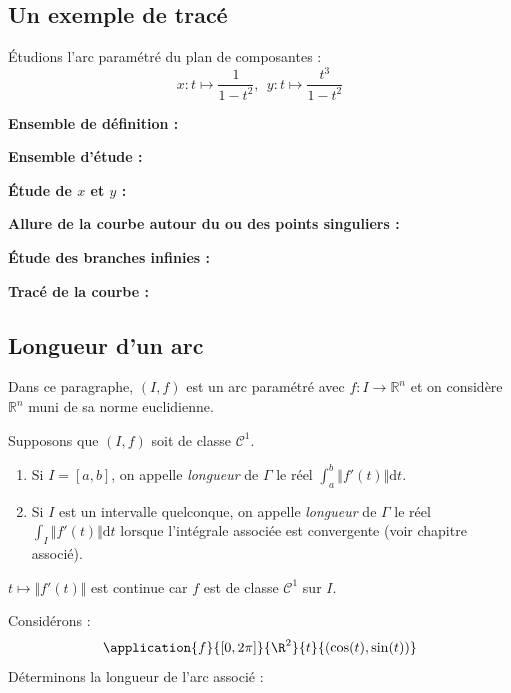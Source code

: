 \documentclass[french,11pt,twoside]{VcCours}
\newcommand{\dt}{\text{d}t}
\begin{document}
\subsection{Un exemple de tracé}
Étudions l'arc paramétré du plan de composantes :
$$ x : t \mapsto \dfrac{1}{1-t^2}, \; \, y : t \mapsto \dfrac{t^3}{1-t^2}$$

\textbf{Ensemble de définition :}

\vspace{1cm}

\newpage
\textbf{Ensemble d'étude :}

\vspace{2cm}

\textbf{Étude de $x$ et $y$ :}

\vspace{12cm}


\textbf{Allure de la courbe autour du ou des points singuliers : }

\vspace{6cm}

\newpage
\textbf{Étude des branches infinies :}

\vspace{7cm}


\textbf{Tracé de la courbe :}

\vspace{6cm}



\subsection{Longueur d'un arc}
Dans ce paragraphe, $(I,f)$ est un arc paramétré avec $f : I \rightarrow \mathbb{R}^n$ et on considère $\mathbb{R}^n$ muni de sa norme euclidienne.

\begin{Definition}{} Supposons que $(I,f)$ soit de classe $\mathcal{C}^1$. 

\begin{enumerate}
\item Si $I=[a,b]$, on appelle \emph{longueur} de $\Gamma$ le réel $\int_{a}^b \Vert f'(t) \Vert \dt$.
\item Si $I$ est un intervalle quelconque, on appelle \emph{longueur} de $\Gamma$ le réel $\int_{I} \Vert f'(t) \Vert \dt$ lorsque l'intégrale associée est convergente (voir chapitre associé).
\end{enumerate}
\end{Definition}

\begin{Remarque}{} $t \mapsto \Vert f'(t) \Vert$ est continue car $f$ est de classe $\mathcal{C}^1$ sur $I$.
\end{Remarque}

\newpage
\begin{Exemple} Considérons : 
	\[\application{f}{[0,2\pi]}{\R^2}{t}{(\cos(t), \sin(t))}\]
Déterminons la longueur de l'arc associé :

\vspace*{4cm}
\end{Exemple}
\end{document}
